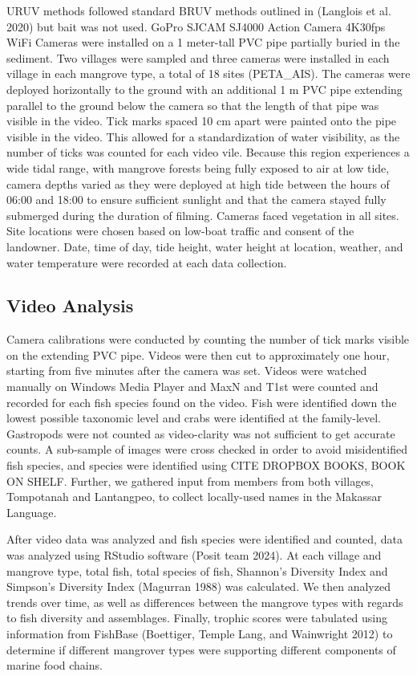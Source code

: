 \documentclass[
]{article}
\begin{document}
URUV methods followed standard BRUV methods outlined in (Langlois et al. 2020) but bait was not used. GoPro SJCAM SJ4000 Action Camera 4K30fps WiFi Cameras were installed on a 1 meter-tall PVC pipe partially buried in the sediment. Two villages were sampled and three cameras were installed in each village in each mangrove type, a total of 18 sites (PETA\_AIS). The cameras were deployed horizontally to the ground with an additional 1 m PVC pipe extending parallel to the ground below the camera so that the length of that pipe was visible in the video. Tick marks spaced 10 cm apart were painted onto the pipe visible in the video. This allowed for a standardization of water visibility, as the number of ticks was counted for each video vile. Because this region experiences a wide tidal range, with mangrove forests being fully exposed to air at low tide, camera depths varied as they were deployed at high tide between the hours of 06:00 and 18:00 to ensure sufficient sunlight and that the camera stayed fully submerged during the duration of filming. Cameras faced vegetation in all sites. Site locations were chosen based on low-boat traffic and consent of the landowner. Date, time of day, tide height, water height at location, weather, and water temperature were recorded at each data collection.

\subsection{Video Analysis}\label{video-analysis}

Camera calibrations were conducted by counting the number of tick marks visible on the extending PVC pipe. Videos were then cut to approximately one hour, starting from five minutes after the camera was set. Videos were watched manually on Windows Media Player and MaxN and T1st were counted and recorded for each fish species found on the video. Fish were identified down the lowest possible taxonomic level and crabs were identified at the family-level. Gastropods were not counted as video-clarity was not sufficient to get accurate counts. A sub-sample of images were cross checked in order to avoid misidentified fish species, and species were identified using CITE DROPBOX BOOKS, BOOK ON SHELF. Further, we gathered input from members from both villages, Tompotanah and Lantangpeo, to collect locally-used names in the Makassar Language.

After video data was analyzed and fish species were identified and counted, data was analyzed using RStudio software (Posit team 2024). At each village and mangrove type, total fish, total species of fish, Shannon's Diversity Index and Simpson's Diversity Index (Magurran 1988) was calculated. We then analyzed trends over time, as well as differences between the mangrove types with regards to fish diversity and assemblages. Finally, trophic scores were tabulated using information from FishBase (Boettiger, Temple Lang, and Wainwright 2012) to determine if different mangrover types were supporting different components of marine food chains.
\end{document}
